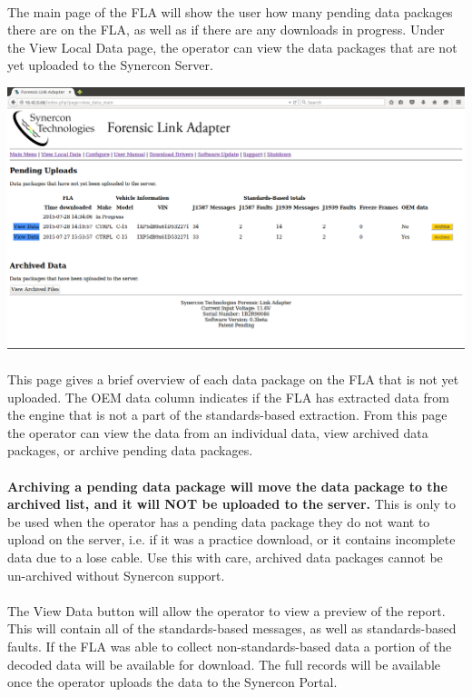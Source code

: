 \documentclass[11pt, oneside]{book}
\begin{document}
\paragraph{}
The main page of the FLA will show the user how many pending data packages there are on the FLA, as well as if there are any downloads in progress. Under the View Local Data page, the operator can view the data packages that are not yet uploaded to the Synercon Server.
\begin{center}
\includegraphics[width=1\linewidth]{../media/fla_preview_screenshots/local_data}
\end{center}
\paragraph{  }
This page gives a brief overview of each data package on the FLA that is not yet uploaded. The OEM data column indicates if the FLA has extracted data from the engine that is not a part of the standards-based extraction. From this page the operator can view the data from an individual data, view archived data packages, or archive pending data packages.
\paragraph{  }
\textbf{Archiving a pending data package will move the data package to the archived list, and it will NOT be uploaded to the server.}
This is only to be used when the operator has a pending data package they do not want to upload on the server, i.e. if it was a practice download, or it contains incomplete data due to a lose cable. Use this with care, archived data packages cannot be un-archived without Synercon support.
\paragraph{  }
The View Data button will allow the operator to view a preview of the report. This will contain all of the standards-based messages, as well as standards-based faults. If the FLA was able to collect non-standards-based data a portion of the decoded data will be available for download. The full records will be available once the operator uploads the data to the Synercon Portal.
\end{document}
